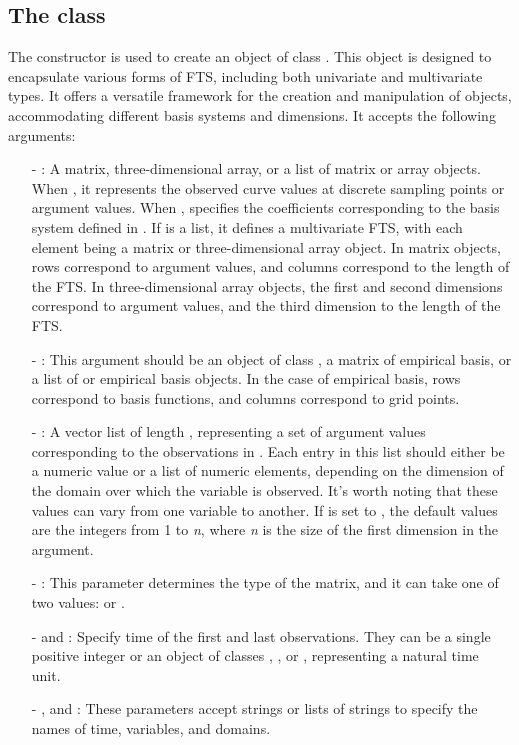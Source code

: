 \subsection{The  class}\label{subsec:fts}
The  constructor is used to create an  object of 
class . This object is designed to encapsulate various forms of 
FTS, including both univariate and multivariate types. It offers a 
versatile framework for the creation and manipulation of   objects, 
accommodating different basis systems and dimensions. It accepts 
the following arguments:
 \begin{itemize}
 	\item[-] : A matrix, three-dimensional array, or a list of matrix or 
 	array objects. When , it represents the observed curve 
 	values at discrete sampling points or argument values. When 
 	,  specifies the coefficients corresponding to the 
 	basis system defined in . If  is a list, it defines a 
 	multivariate FTS, with each element being a matrix or three-dimensional array 
 	object. In matrix objects, rows correspond to argument values, and columns 
 	correspond to the length of the FTS. In three-dimensional array objects, the 
 	first and second dimensions correspond to argument values, and the third 
 	dimension to the length of the FTS.	
 	\item[-] : This argument should be an object of class 
 	, a matrix of empirical basis, or a list of  or 
 	empirical basis objects. In the case of empirical basis, rows correspond to 
 	basis functions, and columns correspond to grid points.
 	\item[-] : A vector list of length , 
 	representing a set of argument values corresponding to the observations in 
 	. Each entry in this list should either be a numeric value or a list of 
 	numeric elements, depending on the dimension of the domain over which the 
 	variable is observed. It's worth noting that these values can vary from one 
 	variable to another. If  is set to , the default values 
 	are the integers from 1 to \textit{n}, where \textit{n} is the size of the first 
 	dimension in the  argument. 	
 	\item[-] : This parameter determines the type of the  
 	matrix, and it can take one of two values:  or . 	
 	\item[-]  and : Specify time of the first and last observations. They can be a 
 	single positive integer or an object of classes , , or 
 	, representing a natural time unit.
 	\item[-] ,  and : These parameters accept strings or lists of strings to specify the names of time, variables, and domains.
 \end{itemize}
